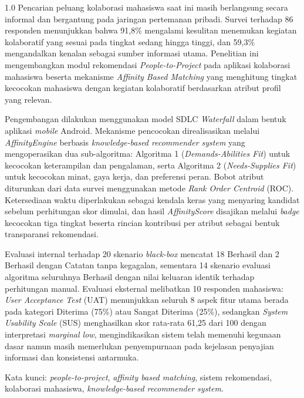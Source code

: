 \begin{spacing}{1.0}
Pencarian peluang kolaborasi mahasiswa saat ini masih berlangsung secara informal dan bergantung pada jaringan pertemanan pribadi. Survei terhadap 86 responden menunjukkan bahwa 91,8\% mengalami kesulitan menemukan kegiatan kolaboratif yang sesuai pada tingkat sedang hingga tinggi, dan 59,3\% mengandalkan kenalan sebagai sumber informasi utama. Penelitian ini mengembangkan modul rekomendasi \emph{People-to-Project} pada aplikasi kolaborasi mahasiswa beserta mekanisme \emph{Affinity Based Matching} yang menghitung tingkat kecocokan mahasiswa dengan kegiatan kolaboratif berdasarkan atribut profil yang relevan.

Pengembangan dilakukan menggunakan model SDLC \emph{Waterfall} dalam bentuk aplikasi \emph{mobile} Android. Mekanisme pencocokan direalisasikan melalui \emph{AffinityEngine} berbasis \emph{knowledge-based recommender system} yang mengoperasikan dua sub-algoritma: Algoritma 1 (\emph{Demands-Abilities Fit}) untuk kecocokan keterampilan dan pengalaman, serta Algoritma 2 (\emph{Needs-Supplies Fit}) untuk kecocokan minat, gaya kerja, dan preferensi peran. Bobot atribut diturunkan dari data survei menggunakan metode \emph{Rank Order Centroid} (ROC). Ketersediaan waktu diperlakukan sebagai kendala keras yang menyaring kandidat sebelum perhitungan skor dimulai, dan hasil \emph{AffinityScore} disajikan melalui \emph{badge} kecocokan tiga tingkat beserta rincian kontribusi per atribut sebagai bentuk transparansi rekomendasi.

Evaluasi internal terhadap 20 skenario \emph{black-box} mencatat 18 Berhasil dan 2 Berhasil dengan Catatan tanpa kegagalan, sementara 14 skenario evaluasi algoritma seluruhnya Berhasil dengan nilai keluaran identik terhadap perhitungan manual. Evaluasi eksternal melibatkan 10 responden mahasiswa: \emph{User Acceptance Test} (UAT) menunjukkan seluruh 8 aspek fitur utama berada pada kategori Diterima (75\%) atau Sangat Diterima (25\%), sedangkan \emph{System Usability Scale} (SUS) menghasilkan skor rata-rata 61,25 dari 100 dengan interpretasi \emph{marginal low}, mengindikasikan sistem telah memenuhi kegunaan dasar namun masih memerlukan penyempurnaan pada kejelasan penyajian informasi dan konsistensi antarmuka.

Kata kunci: \emph{people-to-project}, \emph{affinity based matching}, sistem rekomendasi, kolaborasi mahasiswa, \emph{knowledge-based recommender system}.
\end{spacing}
